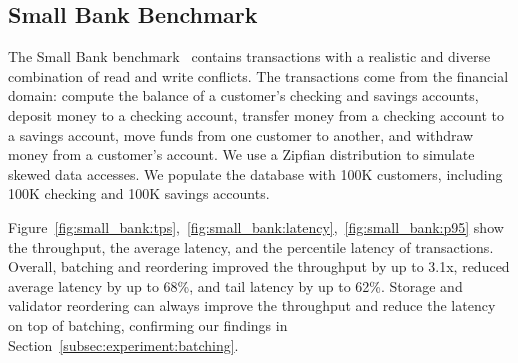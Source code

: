 \subsection{Small Bank Benchmark}
\label{subsec:experiment:smallbank}


The Small Bank benchmark~\cite{alomari2008icde} contains transactions with a realistic and diverse
combination of read and write conflicts. The transactions come from the
financial domain: compute the balance of a customer's checking and savings
accounts, deposit money to a checking account, transfer money from a checking
account to a savings account, move funds from one customer to another, and withdraw money from a customer's account. We use a Zipfian distribution to simulate skewed data accesses. We populate the database with 100K customers, including 100K checking and 100K savings accounts.

Figure~\ref{fig:small_bank:tps},~\ref{fig:small_bank:latency},~\ref{fig:small_bank:p95} show the throughput, the average latency, and the percentile latency of transactions. Overall, batching and reordering improved the throughput by up to 3.1x, reduced average latency by up to 68\%, and tail latency by up to 62\%. Storage and validator reordering can always improve the throughput and reduce the latency on top of batching, confirming our findings in Section~\ref{subsec:experiment:batching}.

